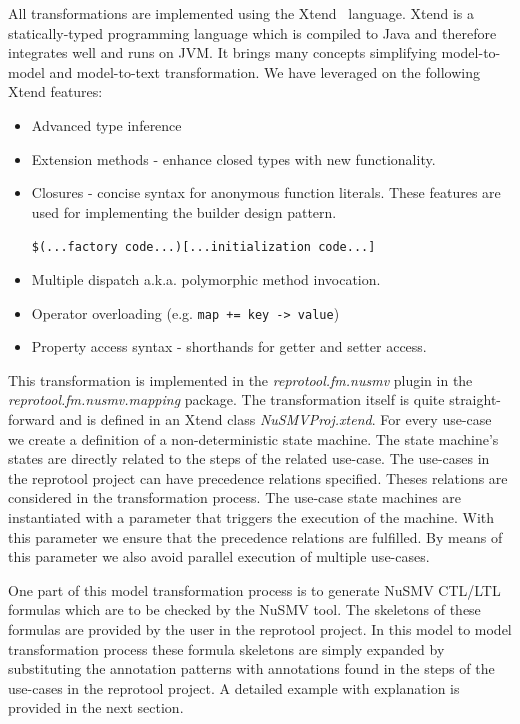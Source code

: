 All transformations are implemented using the Xtend~\cite{Xtend-website} language.
Xtend is a statically-typed programming language which is compiled to Java and therefore integrates well and runs on JVM. It brings many concepts simplifying model-to-model and model-to-text transformation. We have leveraged on the following Xtend features: 
\begin{itemize}
	\item Advanced type inference
	\item Extension methods - enhance closed types with new functionality.
	\item Closures - concise syntax for anonymous function literals.
		These features are used for implementing the builder design pattern.
	
		\verb|$(...factory code...)[...initialization code...]|
	
	\item Multiple dispatch a.k.a. polymorphic method invocation.
	\item Operator overloading (e.g. \verb|map += key -> value|)
	\item Property access syntax - shorthands for getter and setter access.
\end{itemize}

This transformation is implemented in the \emph{reprotool.fm.nusmv} plugin in the \emph{reprotool.fm.nusmv.mapping} package.
The transformation itself is quite straight-forward and is defined in an Xtend class \emph{NuSMVProj.xtend}.
For every use-case we create a definition of a non-deterministic state machine.
The state machine's states are directly related to the steps of the related use-case.
The use-cases in the reprotool project can have precedence relations specified. Theses relations are considered in the
transformation process. The use-case state machines are instantiated with a parameter that triggers the execution of the machine.
With this parameter we ensure that the precedence relations are fulfilled. By means of this parameter we also avoid parallel execution
of multiple use-cases.

One part of this model transformation process is to generate NuSMV CTL/LTL formulas which are to be checked by the NuSMV tool. The
skeletons of these formulas are provided by the user in the reprotool project. In this model to model transformation process these
formula skeletons are simply expanded by substituting the annotation patterns with annotations found in the steps of the use-cases
in the reprotool project. A detailed example with explanation is provided in the next section.

